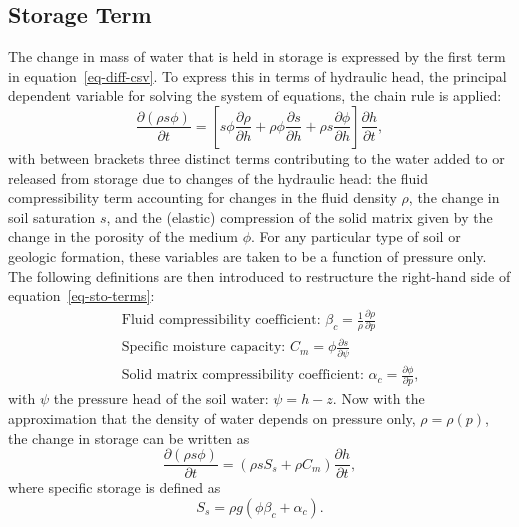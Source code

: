\documentclass[fleqn]{article}
\begin{document}
\subsection{Storage Term}
The change in mass of water that is held in storage is expressed by the first 
term in equation~\ref{eq-diff-csv}. To express this in terms of hydraulic
head, the principal dependent variable for solving the system of equations,
the chain rule is applied:
\begin{equation}
  \frac{\partial (\rho s \phi)}{\partial t} =
  \left[
    s \phi \frac{\partial \rho}{\partial h} +
    \rho \phi \frac{\partial s}{\partial h} +
    \rho s \frac{\partial \phi}{\partial h}
  \right]
  \frac{\partial h}{\partial t},
  \label{eq-sto-terms}
\end{equation}
with between brackets three distinct terms contributing to the water 
added to or released from storage due to changes of the hydraulic 
head: the fluid compressibility term accounting for changes in the 
fluid density $\rho$, the change in soil saturation $s$, and the (elastic) compression of the solid matrix given by the change in the porosity 
of the medium $\phi$. For any particular type of soil or geologic formation,
these variables are taken to be a function of pressure only. The 
following definitions are then introduced to restructure the right-hand 
side of equation~\ref{eq-sto-terms}:
\begin{eqnarray*}
  &&\text{Fluid compressibility coefficient: }
    \beta_c = \frac{1}{\rho} \frac{\partial \rho}{\partial p} \\
  &&\text{Specific moisture capacity: }
    C_m = \phi \frac{\partial s}{\partial \psi} \\
  &&\text{Solid matrix compressibility coefficient: }
    \alpha_c = \frac{\partial \phi}{\partial p},
\end{eqnarray*}
with $\psi$ the pressure head of the soil water: $\psi = h - z$. Now
with the approximation that the density of water depends on pressure 
only, $\rho = \rho(p)$, the change in storage can be written as
\begin{equation}
  \frac{\partial (\rho s \phi)}{\partial t} =
  \left(
    \rho s S_s + \rho C_m
  \right)
  \frac{\partial h}{\partial t},
  \label{eq-sto}
\end{equation}
where specific storage is defined as
\begin{equation}
  S_s = \rho g \left( \phi \beta_c + \alpha_c \right).
\end{equation}
\end{document}
